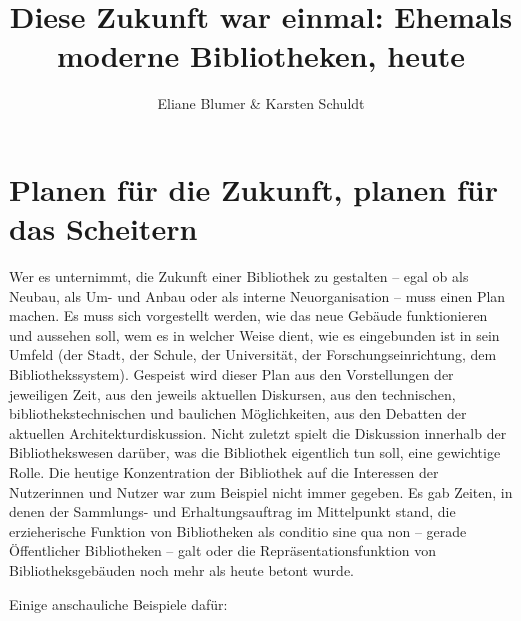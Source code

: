 \documentclass[a4paper,
fontsize=11pt,
oneside,
numbers=noperiodatend,
parskip=half-,
bibliography=totoc,
final
]{scrartcl}
\title{\LARGE{Diese Zukunft war einmal: Ehemals moderne Bibliotheken, heute}} %
\author{Eliane Blumer \& Karsten Schuldt} %
\date{}
\begin{document}
\maketitle
\thispagestyle{fancyplain} 


\section*{Planen für die Zukunft, planen für das
Scheitern}\label{planen-fuxfcr-die-zukunft-planen-fuxfcr-das-scheitern}

Wer es unternimmt, die Zukunft einer Bibliothek zu gestalten -- egal ob
als Neubau, als Um- und Anbau oder als interne Neuorganisation -- muss
einen Plan machen. Es muss sich vorgestellt werden, wie das neue Gebäude
funktionieren und aussehen soll, wem es in welcher Weise dient, wie es
eingebunden ist in sein Umfeld (der Stadt, der Schule, der Universität,
der Forschungseinrichtung, dem Bibliothekssystem). Gespeist wird dieser
Plan aus den Vorstellungen der jeweiligen Zeit, aus den jeweils
aktuellen Diskursen, aus den technischen, bibliothekstechnischen und
baulichen Möglichkeiten, aus den Debatten der aktuellen
Architekturdiskussion. Nicht zuletzt spielt die Diskussion innerhalb der
Bibliothekswesen darüber, was die Bibliothek eigentlich tun soll, eine
gewichtige Rolle. Die heutige Konzentration der Bibliothek auf die
Interessen der Nutzerinnen und Nutzer war zum Beispiel nicht immer
gegeben. Es gab Zeiten, in denen der Sammlungs- und Erhaltungsauftrag im
Mittelpunkt stand, die erzieherische Funktion von Bibliotheken als
conditio sine qua non -- gerade Öffentlicher Bibliotheken -- galt oder
die Repräsentationsfunktion von Bibliotheksgebäuden noch mehr als heute
betont wurde.

Einige anschauliche Beispiele dafür:
\end{document}
